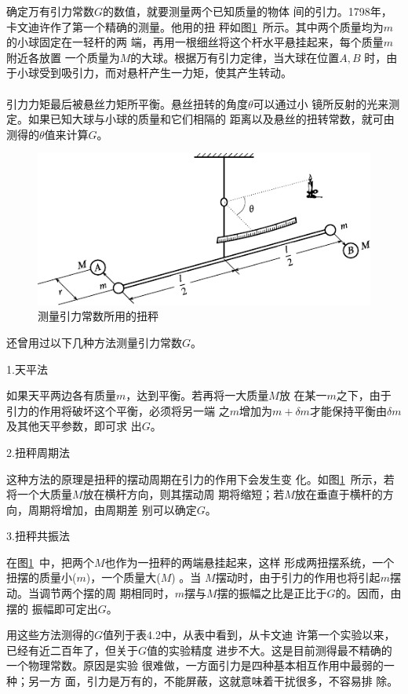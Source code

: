 确定万有引力常数$ G $的数值，就要测量两个已知质量的物体
间的引力。1798年，卡文迪许作了第一个精确的测量。他用的扭
秤如图\ref{fig:04.04}~所示。其中两个质量均为$ m $的小球固定在一轻杆的两
端，再用一根细丝将这个杆水平悬挂起来，每个质量$ m $附近各放置
一个质量为$ M $的大球。根据万有引力定律，当大球在位置$ A , B $
时，由于小球受到吸引力，而对悬杆产生一力矩，使其产生转动。\\~\\
引力力矩最后被悬丝力矩所平衡。悬丝扭转的角度$ \theta $可以通过小
镜所反射的光来测定。如果已知大球与小球的质量和它们相隔的
距离以及悬丝的扭转常数，就可由测得的$ \theta $值来计算$ G $。
\begin{figure}[h]
  \centering
  \includegraphics{figure/fig04.04}
  \caption{测量引力常数所用的扭秤}
  \label{fig:04.04}
\end{figure}

还曾用过以下几种方法测量引力常数$ G $。

\textsf{1.天平法}

如果天平两边各有质量$ m $，达到平衡。若再将一大质量$ M $放
在某一$ m $之下，由于引力的作用将破坏这个平衡，必须将另一端
之$ m $增加为$  m + \delta m $才能保持平衡由$ \delta m $及其他天平参数，即可求
出$ G $。

\textsf{2.扭秤周期法}

这种方法的原理是扭秤的摆动周期在引力的作用下会发生变
化。如图\ref{fig:04.04}~所示，若将一个大质量$ M $放在横杆方向，则其摆动周
期将缩短；若$ M $放在垂直于横杆的方向，周期将增加，由周期差
别可以确定$ G $。

\textsf{3.扭秤共振法}

在图\ref{fig:04.04}~中，把两个$ M $也作为一扭秤的两端悬挂起来，这样
形成两扭摆系统，一个扭摆的质量小($ m $)，一个质量大($ M $)  。当
$ M $摆动时，由于引力的作用也将引起$ m $摆动。当调节两个摆的周
期相同时，$ m $摆与$ M $摆的振幅之比是正比于$ G $的。因而，由摆的
振幅即可定出$ G $。

用这些方法测得的$ G $值列于表4.2中，从表中看到，从卡文迪
许第一个实验以来，已经有近二百年了，但关于$ G $值的实验精度
进步不大。这是目前测得最不精确的一个物理常数。原因是实验
很难做，一方面引力是四种基本相互作用中最弱的一种；另一方
面，引力是万有的，不能屏蔽，这就意味着干扰很多，不容易排
除。

